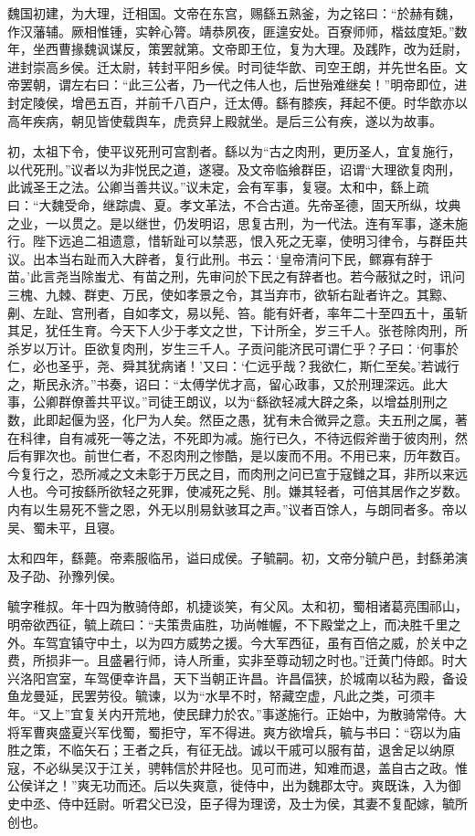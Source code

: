 \documentclass[12pt,UTF8]{ctexbook}
\begin{document}
魏国初建，为大理，迁相国。文帝在东宫，赐繇五熟釜，为之铭曰：“於赫有魏，作汉藩辅。厥相惟锺，实幹心膂。靖恭夙夜，匪遑安处。百寮师师，楷兹度矩。”数年，坐西曹掾魏讽谋反，策罢就第。文帝即王位，复为大理。及践阼，改为廷尉，进封崇高乡侯。迁太尉，转封平阳乡侯。时司徒华歆、司空王朗，并先世名臣。文帝罢朝，谓左右曰：“此三公者，乃一代之伟人也，后世殆难继矣！”明帝即位，进封定陵侯，增邑五百，并前千八百户，迁太傅。繇有膝疾，拜起不便。时华歆亦以高年疾病，朝见皆使载舆车，虎贲舁上殿就坐。是后三公有疾，遂以为故事。

初，太祖下令，使平议死刑可宫割者。繇以为“古之肉刑，更历圣人，宜复施行，以代死刑。”议者以为非悦民之道，遂寝。及文帝临飨群臣，诏谓“大理欲复肉刑，此诚圣王之法。公卿当善共议。”议未定，会有军事，复寝。太和中，繇上疏曰：“大魏受命，继踪虞、夏。孝文革法，不合古道。先帝圣德，固天所纵，坟典之业，一以贯之。是以继世，仍发明诏，思复古刑，为一代法。连有军事，遂未施行。陛下远追二祖遗意，惜斩趾可以禁恶，恨入死之无辜，使明习律令，与群臣共议。出本当右趾而入大辟者，复行此刑。书云：‘皇帝清问下民，鳏寡有辞于苗。'此言尧当除蚩尤、有苗之刑，先审问於下民之有辞者也。若今蔽狱之时，讯问三槐、九棘、群吏、万民，使如孝景之令，其当弃巿，欲斩右趾者许之。其黥、劓、左趾、宫刑者，自如孝文，易以髡、笞。能有奸者，率年二十至四五十，虽斩其足，犹任生育。今天下人少于孝文之世，下计所全，岁三千人。张苍除肉刑，所杀岁以万计。臣欲复肉刑，岁生三千人。子贡问能济民可谓仁乎？子曰：‘何事於仁，必也圣乎，尧、舜其犹病诸！’又曰：‘仁远乎哉？我欲仁，斯仁至矣。’若诚行之，斯民永济。”书奏，诏曰：“太傅学优才高，留心政事，又於刑理深远。此大事，公卿群僚善共平议。”司徒王朗议，以为“繇欲轻减大辟之条，以增益刖刑之数，此即起偃为竖，化尸为人矣。然臣之愚，犹有未合微异之意。夫五刑之属，著在科律，自有减死一等之法，不死即为减。施行已久，不待远假斧凿于彼肉刑，然后有罪次也。前世仁者，不忍肉刑之惨酷，是以废而不用。不用已来，历年数百。今复行之，恐所减之文未彰于万民之目，而肉刑之问已宣于寇雠之耳，非所以来远人也。今可按繇所欲轻之死罪，使减死之髡、刖。嫌其轻者，可倍其居作之岁数。内有以生易死不訾之恩，外无以刖易釱骇耳之声。”议者百馀人，与朗同者多。帝以吴、蜀未平，且寝。

太和四年，繇薨。帝素服临吊，谥曰成侯。子毓嗣。初，文帝分毓户邑，封繇弟演及子劭、孙豫列侯。

毓字稚叔。年十四为散骑侍郎，机捷谈笑，有父风。太和初，蜀相诸葛亮围祁山，明帝欲西征，毓上疏曰：“夫策贵庙胜，功尚帷幄，不下殿堂之上，而决胜千里之外。车驾宜镇守中土，以为四方威势之援。今大军西征，虽有百倍之威，於关中之费，所损非一。且盛暑行师，诗人所重，实非至尊动轫之时也。”迁黄门侍郎。时大兴洛阳宫室，车驾便幸许昌，天下当朝正许昌。许昌偪狭，於城南以毡为殿，备设鱼龙曼延，民罢劳役。毓谏，以为“水旱不时，帑藏空虚，凡此之类，可须丰年。“又上”宜复关内开荒地，使民肆力於农。”事遂施行。正始中，为散骑常侍。大将军曹爽盛夏兴军伐蜀，蜀拒守，军不得进。爽方欲增兵，毓与书曰：“窃以为庙胜之策，不临矢石；王者之兵，有征无战。诚以干戚可以服有苗，退舍足以纳原寇，不必纵吴汉于江关，骋韩信於井陉也。见可而进，知难而退，盖自古之政。惟公侯详之！”爽无功而还。后以失爽意，徙侍中，出为魏郡太守。爽既诛，入为御史中丞、侍中廷尉。听君父已没，臣子得为理谤，及士为侯，其妻不复配嫁，毓所创也。
\end{document}
